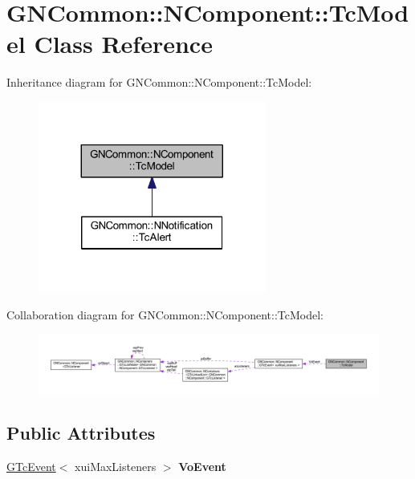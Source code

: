 \hypertarget{class_g_n_common_1_1_n_component_1_1_tc_model}{}\section{G\+N\+Common\+:\+:N\+Component\+:\+:Tc\+Model Class Reference}
\label{class_g_n_common_1_1_n_component_1_1_tc_model}


Inheritance diagram for G\+N\+Common\+:\+:N\+Component\+:\+:Tc\+Model\+:
\nopagebreak
\begin{figure}[H]
\begin{center}
\leavevmode
\includegraphics[width=212pt]{class_g_n_common_1_1_n_component_1_1_tc_model__inherit__graph}
\end{center}
\end{figure}


Collaboration diagram for G\+N\+Common\+:\+:N\+Component\+:\+:Tc\+Model\+:
\nopagebreak
\begin{figure}[H]
\begin{center}
\leavevmode
\includegraphics[width=350pt]{class_g_n_common_1_1_n_component_1_1_tc_model__coll__graph}
\end{center}
\end{figure}
\subsection*{Public Attributes}
\begin{DoxyCompactItemize}
\item 
\mbox{\label{class_g_n_common_1_1_n_component_1_1_tc_model_ad0a33b2b2478b257ef422db8120dde41}} 
\mbox{\hyperlink{class_g_n_common_1_1_n_component_1_1_g_tc_event}{G\+Tc\+Event}}$<$ xui\+Max\+Listeners $>$ {\bfseries Vo\+Event}
\end{DoxyCompactItemize}
